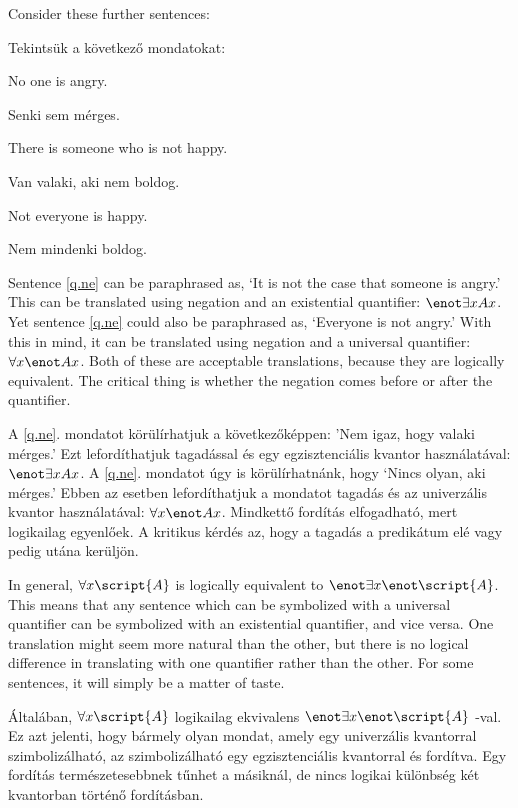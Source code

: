 Consider these further sentences:

Tekintsük a következő mondatokat:
\begin{earg}
\item[\ex{q.ne}] No one is angry.
\item[\ex{q.ne}] Senki sem mérges.
\item[\ex{q.en}] There is someone who is not happy.
\item[\ex{q.en}] Van valaki, aki nem boldog.
\item[\ex{q.na}] Not everyone is happy.
\item[\ex{q.na}] Nem mindenki boldog.
\end{earg}

Sentence \ref{q.ne} can be paraphrased as, `It is not the case that someone is angry.' This can be translated using negation and an existential quantifier: $\enot \exists x Ax$. Yet sentence \ref{q.ne} could also be paraphrased as, `Everyone is not angry.' With this in mind, it can be translated using negation and a universal quantifier: $\forall x \enot Ax$. Both of these are acceptable translations, because they are logically equivalent. The critical thing is whether the negation comes before or after the quantifier.

A \ref{q.ne}. mondatot körülírhatjuk a következőképpen: ’Nem igaz, hogy valaki mérges.’ Ezt lefordíthatjuk tagadással és egy egzisztenciális kvantor használatával: $\enot \exists x Ax$. A \ref{q.ne}. mondatot úgy is körülírhatnánk, hogy ‘Nincs olyan, aki mérges.’ Ebben az esetben lefordíthatjuk a mondatot tagadás és az univerzális kvantor használatával: $\forall x \enot Ax$. Mindkettő fordítás elfogadható, mert logikailag egyenlőek. A kritikus kérdés az, hogy a tagadás a predikátum elé vagy pedig utána kerüljön.




In general, $\forall x\script{A}$ is logically equivalent to $\enot\exists x\enot\script{A}$. This means that any sentence which can be symbolized with a universal quantifier can be symbolized with an existential quantifier, and vice versa. One translation might seem more natural than the other, but there is no logical difference in translating with one quantifier rather than the other. For some sentences, it will simply be a matter of taste.

Általában, $\forall x\script{A}$ logikailag ekvivalens $\enot\exists x\enot\script{A}$ -val. Ez azt jelenti, hogy bármely olyan mondat, amely egy univerzális kvantorral szimbolizálható, az szimbolizálható egy egzisztenciális kvantorral és fordítva. Egy fordítás természetesebbnek tűnhet a másiknál, de nincs logikai különbség két kvantorban történő fordításban.


